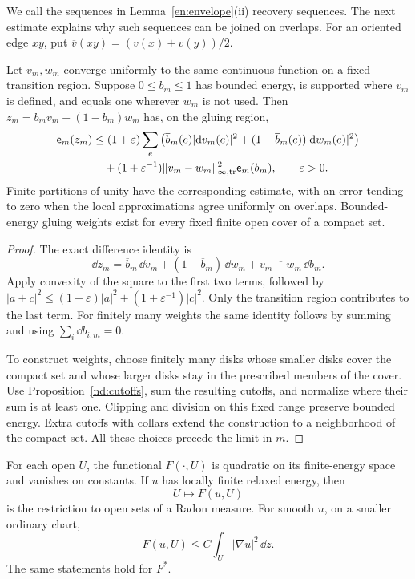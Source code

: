 We call the sequences in Lemma~\ref{en:envelope}(ii) recovery sequences.
The next estimate explains why such sequences can be joined on overlaps.
For an oriented edge $xy$, put
$\overline v(xy)=(v(x)+v(y))/2$.

\begin{lemma}\label{en:fundamental}
Let $v_m,w_m$ converge uniformly to the same continuous function on a
fixed transition region.  Suppose $0\le b_m\le1$ has bounded energy,
is supported where $v_m$ is defined, and equals one wherever $w_m$ is
not used.  Then $z_m=b_mv_m+(1-b_m)w_m$ has, on the gluing region,
\begin{align}\label{en:gluing-estimate}
 \mathsf e_m(z_m)
 &\le(1+\varepsilon)\sum_e
 \left(\overline b_m(e)|\mathrm d v_m(e)|^2
 +(1-\overline b_m(e))|\mathrm d w_m(e)|^2\right)\notag\\
 &\quad +(1+\varepsilon^{-1})
       \|v_m-w_m\|_{\infty,\mathrm{tr}}^2\mathsf e_m(b_m),
 \qquad \varepsilon>0.
\end{align}
Finite partitions of unity have the corresponding estimate, with an
error tending to zero when the local approximations agree uniformly on
overlaps.  Bounded-energy gluing weights exist for every fixed finite
open cover of a compact set.
\end{lemma}

\begin{proof}
The exact difference identity is
\[
 \dd z_m=\overline b_m\,\dd v_m
        +(1-\overline b_m)\,\dd w_m
        +\overline{v_m-w_m}\,\dd b_m.
\]
Apply convexity of the square to the first two terms, followed by
$|a+c|^2\le(1+\varepsilon)|a|^2+
(1+\varepsilon^{-1})|c|^2$.  Only the transition region contributes to
the last term.  For finitely many weights the same identity follows by
summing and using $\sum_i\dd b_{i,m}=0$.

To construct weights, choose finitely many disks whose smaller disks
cover the compact set and whose larger disks stay in the prescribed
members of the cover.  Use Proposition~\ref{nd:cutoffs}, sum the
resulting cutoffs, and normalize where their sum is at least one.
Clipping and division on this fixed range preserve bounded energy.
Extra cutoffs with collars extend the construction to a neighborhood
of the compact set.  All these choices precede the limit in $m$.
\end{proof}

\begin{proposition}\label{en:measure}
For each open $U$, the functional $F(\cdot,U)$ is quadratic on its
finite-energy space and vanishes on constants.  If $u$ has locally
finite relaxed energy, then
\[
                    U\longmapsto F(u,U)
\]
is the restriction to open sets of a Radon measure.  For smooth $u$,
on a smaller ordinary chart,
\begin{equation}\label{en:smooth-upper}
                  F(u,U)\le C\int_U|\nabla u|^2\,\dd z.
\end{equation}
The same statements hold for $F^*$.
\end{proposition}

